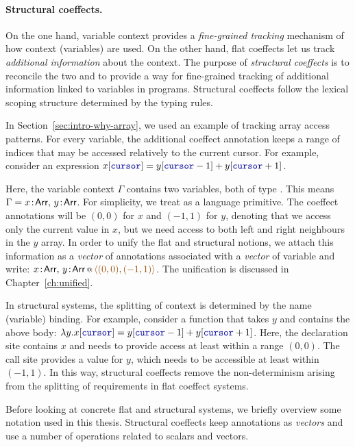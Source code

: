 \paragraph{Structural coeffects.}
On the one hand, variable context provides a \emph{fine-grained tracking} mechanism of how context
(variables) are used. On the other hand, flat coeffects let us track \emph{additional information} about 
the context. The purpose of \emph{structural coeffects} is to reconcile the two and to provide a way
for fine-grained tracking of additional information linked to variables in programs. Structural 
coeffects follow the lexical scoping structure determined by the typing rules.

In Section~\ref{sec:intro-why-array}, we used an example of tracking array access patterns. For every
variable, the additional coeffect annotation keeps a range of indices that may be accessed relatively
to the current cursor. For example, consider an expression 
$x[\kvd{cursor}] = y[\kvd{cursor}-1] + y[\kvd{cursor}+1]$.

Here, the variable context $\Gamma$ contains two variables, both of type . This means
$\Gamma = x\!:\!\ident{Arr},\, y\!:\!\ident{Arr}$. For simplicity, we treat  as a 
language primitive. The coeffect annotations will be $(0,0)$ for $x$ and $(-1,1)$ for $y$, 
denoting that we access only the current value in $x$, but we need access to both left and right 
neighbours in the $y$ array. In order to unify the flat and structural notions, we attach this information 
as a \emph{vector} of annotations associated with a \emph{vector} of variable and write:
$\coctx{x\!:\!\ident{Arr},\, y\!:\!\ident{Arr}}{ \aclrd{\alift{ (0,0), (-1,1) }} }$.
The unification is discussed in Chapter~\ref{ch:unified}.

In structural systems, the splitting of context is determined by the name (variable) binding. 
For example, consider a function that takes $y$ and contains the above body:
$\lambda y.x[\kvd{cursor}] = y[\kvd{cursor}-1] + y[\kvd{cursor}+1]$. Here, the declaration site
contains $x$ and needs to provide access at least within a range $(0,0)$. The call site provides
a value for $y$, which needs to be accessible at least within $(-1, 1)$. In this way, structural
coeffects remove the non-determinism arising from the splitting of requirements in flat coeffect systems.

Before looking at concrete flat and structural systems, we briefly overview 
some notation used in this thesis. Structural coeffects keep annotations as \emph{vectors} and
use a number of operations related to scalars and vectors.

